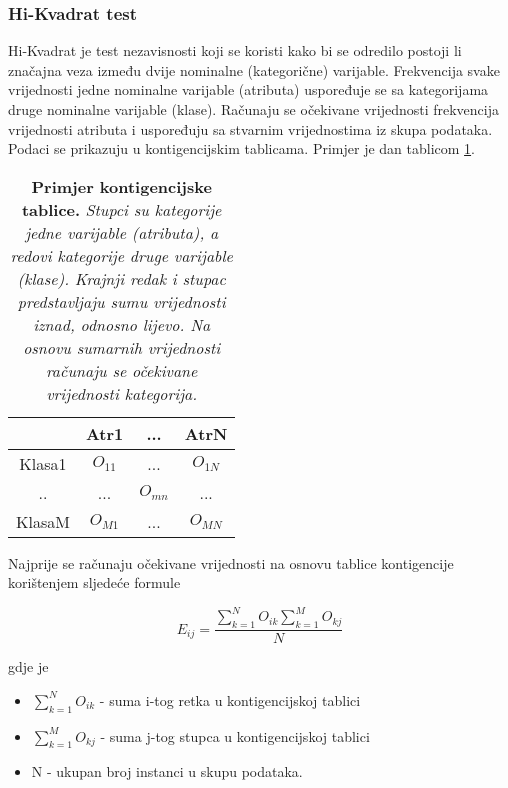\subsubsection{Hi-Kvadrat test}
Hi-Kvadrat je test nezavisnosti koji se koristi kako bi se odredilo postoji li značajna veza između dvije nominalne (kategorične) varijable. Frekvencija svake vrijednosti jedne nominalne varijable (atributa) uspoređuje se sa kategorijama druge nominalne varijable (klase). Računaju se očekivane vrijednosti frekvencija vrijednosti atributa i uspoređuju sa stvarnim vrijednostima iz skupa podataka. Podaci se prikazuju u kontigencijskim tablicama. Primjer je dan tablicom \ref{tab:contig}.
\begin{center}
    \begin{table}[!ht]
    \caption[Kontigencijska tablica]{
    \label{tab:contig}
    \textbf{Primjer kontigencijske tablice.} \textit{Stupci su kategorije jedne varijable (atributa), a redovi kategorije druge varijable (klase). Krajnji redak i stupac predstavljaju sumu vrijednosti iznad, odnosno lijevo. Na osnovu sumarnih vrijednosti računaju se očekivane vrijednosti kategorija.}}
   \centering
   \begin{tabular}{||c | c | c | c ||}
   \hline
     & Atr1 & ... & AtrN \\ [0.5ex]
   \hline\hline
   Klasa1 & $O_{11}$ & ... & $O_{1N}$  \\
   ..     & ...    & $O_{mn}$ & ...  \\
   KlasaM & $O_{M1}$ & ... & $O_{MN}$  \\ [1ex]
    \hline
    \end{tabular}
    \end{table}
\end{center}
Najprije se računaju očekivane vrijednosti na osnovu tablice kontigencije korištenjem sljedeće formule

\begin{equation}\label{eq:chiexpect}
E_{ij} = \frac{\sum_{k=1}^{N}O_{ik}\sum_{k=1}^{M}O_{kj}}{N}
\end{equation}

gdje je 

\begin{itemize}
    \item $\sum_{k=1}^{N}O_{ik}$ - suma i-tog retka u kontigencijskoj tablici
    \item $\sum_{k=1}^{M}O_{kj}$ - suma j-tog stupca u kontigencijskoj tablici
    \item N - ukupan broj instanci u skupu podataka.
\end{itemize}

